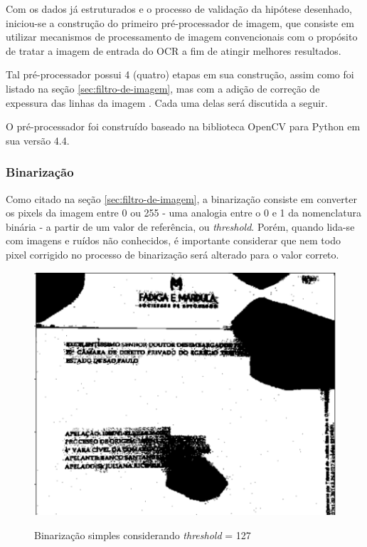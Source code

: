 Com os dados já estruturados e o processo de validação da hipótese desenhado, iniciou-se a construção do primeiro pré-processador de imagem, que consiste em utilizar mecanismos de processamento de imagem convencionais com o propósito de tratar a imagem de entrada do OCR a fim de atingir melhores resultados.

Tal pré-processador possui 4 (quatro) etapas em sua construção, assim como foi listado na seção \ref{sec:filtro-de-imagem}, mas com a adição de correção de expessura das linhas da imagem \cite{K3M-image-skeletonization}. Cada uma delas será discutida a seguir.

O pré-processador foi construído baseado na biblioteca OpenCV para Python em sua versão 4.4.

\subsubsection{Binarização}

Como citado na seção \ref{sec:filtro-de-imagem}, a binarização consiste em converter os pixels da imagem entre 0 ou 255 - uma analogia entre o 0 e 1 da nomenclatura binária - a partir de um valor de referência, ou \textit{threshold}. Porém, quando lida-se com imagens e ruídos não conhecidos, é importante considerar que nem todo pixel corrigido no processo de binarização será alterado para o valor correto.

\begin{figure}[H]
  \centering
  \caption{Binarização simples considerando \textit{threshold} = 127}
  \includegraphics[scale=.7]{figuras/binarizacao-simples.png}
  \label{fig:binarizacao-simples}
\end{figure}

